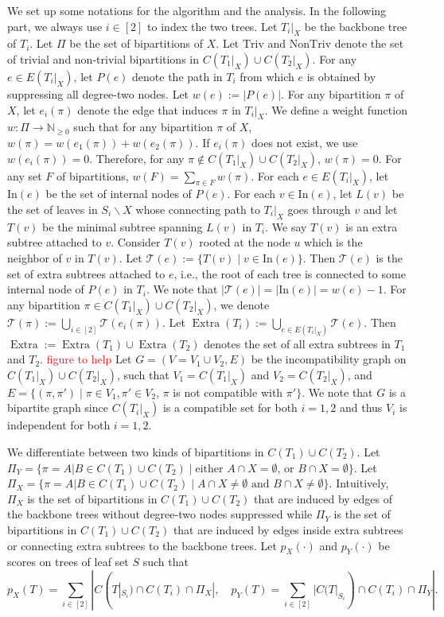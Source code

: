 \documentclass{bmcart}
\newcommand{\note}[1]{\textcolor{red}{#1}}
\newcommand{\In}{\mathrm{In}}
\newcommand{\triv}{\mathrm{Triv}}
\newcommand{\ntriv}{\mathrm{NonTriv}}
\DeclareMathOperator*{\extra}{Extra}
\theoremstyle{mystyle}
\theoremstyle{proofstyle}
\begin{document}
We set up some notations for the algorithm and the analysis. In the following part, we always use $i\in[2]$ to index the two trees. Let $T_i|_X$ be the backbone tree of $T_i$. Let $\Pi$ be the set of bipartitions of $X$. Let $\triv$ and $\ntriv$ denote the set of trivial and non-trivial bipartitions in $C(T_1|_X) \cup C(T_2|_X)$. For any $e \in E(T_i|_X)$, let $P(e)$ denote the path in $T_i$ from which $e$ is obtained by suppressing all degree-two nodes. Let $w(e):= |P(e)|$. For any bipartition $\pi$ of $X$, let $e_i(\pi)$ denote the edge that induces $\pi$ in $T_i|_X$. We define a weight function $w:\Pi \to \mathbb{N}_{\ge 0}$ such that for any bipartition $\pi$ of $X$, $w(\pi) = w(e_1(\pi)) + w(e_2(\pi))$. If $e_i(\pi)$ does not exist, we use $w(e_i(\pi)) = 0$. Therefore, for any $\pi \notin C(T_1|_X) \cup C(T_2|_X)$, $w(\pi) = 0$. For any set $F$ of bipartitions, $w(F) = \sum_{\pi \in F} w(\pi)$. For each $e \in E(T_i|_X)$, let $\In(e)$ be the set of internal nodes of $P(e)$. For each $v \in \In(e)$, let $L(v)$ be the set of leaves in $S_i \backslash X$ whose connecting path to $T_i|_X$ goes through $v$ and let $T(v)$ be the minimal subtree spanning $L(v)$ in $T_i$. We say $T(v)$ is an extra subtree attached to $v$. Consider $T(v)$ rooted at the node $u$ which is the neighbor of $v$ in $T(v)$. Let $\mathcal{T}(e) := \{T(v) \mid v \in \In(e)\}$. Then $\mathcal{T}(e)$ is the set of extra subtrees attached to $e$, i.e., the root of each tree is connected to some internal node of $P(e)$ in $T_i$. We note that $|\mathcal{T}(e)| = |\In(e)| = w(e)-1$. For any bipartition $\pi \in C(T_1|_X) \cup C(T_2|_X)$, we denote $\mathcal{T}(\pi) := \bigcup_{i \in [2]} \mathcal{T}(e_i(\pi))$. Let $\extra(T_i) := \bigcup_{e \in E(T_i|_X)} \mathcal{T}(e)$. Then $\extra := \extra(T_1) \cup \extra(T_2)$ denotes the set of all extra subtrees in $T_1$ and $T_2$. \note{figure to help} Let $G = (V=V_1 \cup V_2, E)$ be the incompatibility graph on $C(T_1|_X) \cup C(T_2|_X)$, such that $V_1 = C(T_1|_X)$ and $V_2 = C(T_2|_X)$, and $E = \{(\pi, \pi') \mid \pi \in V_1, \pi' \in V_2$, $\pi$ is not compatible with $\pi'\}$. We note that $G$ is a bipartite graph since $C(T_i|_X)$ is a compatible set for both $i=1,2$ and thus $V_i$ is independent for both $i = 1,2$.\smallskip

We differentiate between two kinds of bipartitions in $C(T_1) \cup C(T_2)$. Let $\Pi_Y = \{\pi = A|B \in C(T_1) \cup C(T_2) \mid \text{either } A\cap X = \emptyset \text{, or } B \cap X = \emptyset\}$. Let $\Pi_X = \{\pi = A|B \in C(T_1) \cup C(T_2) \mid A\cap X \neq \emptyset \text{ and } B\cap X \neq \emptyset \}$. Intuitively, $\Pi_X$ is the set of bipartitions in $C(T_1)\cup C(T_2)$ that are induced by edges of the backbone trees without degree-two nodes suppressed while $\Pi_Y$ is the set of bipartitions in $C(T_1)\cup C(T_2)$ that are induced by edges inside extra subtrees or connecting extra subtrees to the backbone trees. Let $p_X(\cdot)$ and $p_Y(\cdot)$ be scores on trees of leaf set $S$ such that
\[
    p_X(T) = \sum_{i \in [2]}|C(T|_{S_i}) \cap C(T_i) \cap \Pi_X|, \quad p_Y(T) = \sum_{i \in [2]} |C(T|_{S_i}) \cap C(T_i) \cap \Pi_Y|.
\]
\end{document}
